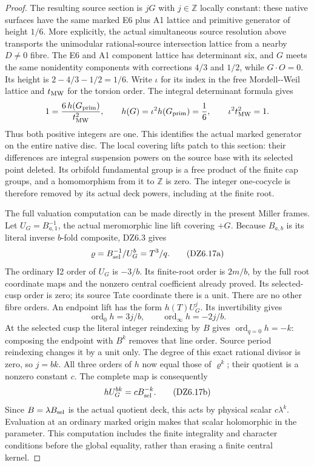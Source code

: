 \begin{proof}
The resulting source section is \(jG\) with \(j\in\mathbb Z\)
locally constant: these native surfaces have the same marked
E6 plus A1 lattice and primitive generator of height \(1/6\).
More explicitly, the actual simultaneous source resolution above
transports the unimodular rational-source intersection lattice
from a nearby \(D\ne0\) fibre. The E6 and A1 component lattice
has determinant six, and \(G\) meets the same nonidentity
components with corrections \(4/3\) and \(1/2\), while
\(G\cdot O=0\). Its height is \(2-4/3-1/2=1/6\).
Write \(\iota\) for its index in the free Mordell-\/-Weil lattice
and \(t_{\rm MW}\) for the torsion order. The integral
determinant formula gives
\[
 1=\frac{6\,h(G_{\rm prim})}{t_{\rm MW}^2},\qquad
 h(G)=\iota^2 h(G_{\rm prim})=\frac16,\qquad
                 \iota^2 t_{\rm MW}^2=1.
\]
Thus both positive integers are one. This identifies the
actual marked generator on the entire native disc.
The local covering lifts patch to this section: their differences
are integral suspension powers on the source base with its
selected point deleted. Its orbifold fundamental group is a
free product of the finite cap groups, and a homomorphism from
it to \(\mathbb Z\) is zero. The integer one-cocycle is
therefore removed by its actual deck powers, including at the
finite root.

The full valuation computation can be made directly in the
present Miller frames. Let \(U_G=B_{a,1}^{-1}\), the actual
meromorphic line lift covering \(+G\). Because \(B_{a,b}\)
is its literal inverse \(b\)-fold composite, DZ6.3 gives
\[
                 \varrho=B_{\rm sel}^{-1}/U_G^b=T^3/q.
 \tag{DZ6.17a}
\]
The ordinary I2 order of \(U_G\) is \(-3/b\).
Its finite-root order is \(2m/b\), by the full root coordinate
maps and the nonzero central coefficient already proved.
Its selected-cusp order is zero; its source Tate coordinate
there is a unit. There are no other fibre orders.
An endpoint lift has the form \(h(T)U_G^j\). Its invertibility
gives
\[
 \operatorname{ord}_0h=3j/b,\qquad
 \operatorname{ord}_\infty h=-2j/b.
\]
At the selected cusp the literal integer reindexing by \(B\)
gives \(\operatorname{ord}_{q=0}h=-k\): composing the
endpoint with \(B^k\) removes that line order. Source period
reindexing changes it by a unit only. The degree of this exact
rational divisor is zero, so \(j=bk\). All three orders of
\(h\) now equal those of \(\varrho^k\); their quotient is a
nonzero constant \(c\). The complete map is consequently
\[
              hU_G^{bk}=cB_{\rm sel}^{-k}.
 \tag{DZ6.17b}
\]
Since \(B=\lambda B_{\rm sel}\) is the actual quotient deck,
this acts by physical scalar \(c\lambda^k\).
Evaluation at an ordinary marked origin makes that scalar
holomorphic in the parameter. This computation includes the
finite integrality and character conditions before the global
equality, rather than erasing a finite central kernel.


\end{proof}
